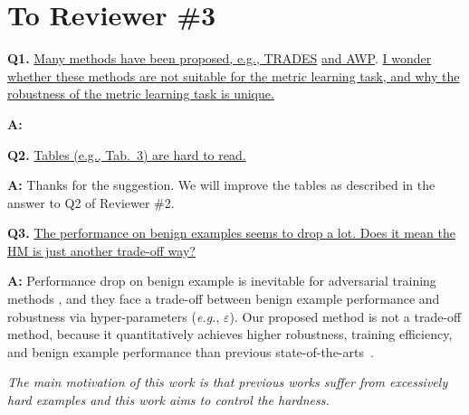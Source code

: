 \documentclass[10pt,twocolumn,letterpaper]{article}
\begin{document}
\section*{To Reviewer \#3}

\noindent\textbf{Q1.}
%
\ul{Many methods have been proposed, e.g., TRADES}\cite{trades} \ul{and AWP}\cite{awp}.
\ul{I wonder whether these methods are not suitable for the metric learning task, and why the robustness of the metric learning task is unique.
}

\noindent\textbf{A:}

\begin{comment}
\noindent\textbf{Q2.} \ul{Does simple tricks for adjusting the hardness.}
\end{comment}

\noindent\textbf{Q2.}
%
\ul{Tables (e.g., Tab.~3) are hard to read.}

\noindent\textbf{A:} Thanks for the suggestion. We will improve the tables as described in the answer to Q2 of Reviewer \#2.

\noindent\textbf{Q3.}
%
\ul{The performance on benign examples seems to drop a lot. Does it mean the
HM is just another trade-off way?}

\noindent\textbf{A:}
%
Performance drop on benign example is inevitable for adversarial training
methods \cite{madry,trades,awp,advrank,robrank}, and they face a trade-off
between benign example performance and robustness via hyper-parameters
(\emph{e.g.}, $\varepsilon$).
%
Our proposed method is not a trade-off method, because it quantitatively
achieves higher robustness, training efficiency, and benign example performance
than previous state-of-the-arts~\cite{advrank,robrank}.

\emph{The main motivation of this work is that previous works suffer from excessively hard examples and this work aims to control the hardness.}

{\small


}
\end{document}
